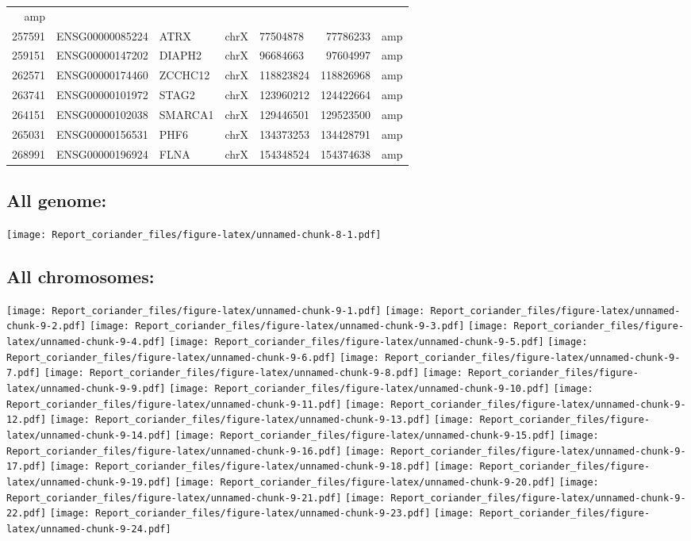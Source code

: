 \documentclass[]{article}
\begin{document}
\begin{longtable}[]{@{}rrlrlrl@{}}
amp\tabularnewline
257591 & ENSG00000085224 & ATRX & chrX & 77504878 & 77786233 &
amp\tabularnewline
259151 & ENSG00000147202 & DIAPH2 & chrX & 96684663 & 97604997 &
amp\tabularnewline
262571 & ENSG00000174460 & ZCCHC12 & chrX & 118823824 & 118826968 &
amp\tabularnewline
263741 & ENSG00000101972 & STAG2 & chrX & 123960212 & 124422664 &
amp\tabularnewline
264151 & ENSG00000102038 & SMARCA1 & chrX & 129446501 & 129523500 &
amp\tabularnewline
265031 & ENSG00000156531 & PHF6 & chrX & 134373253 & 134428791 &
amp\tabularnewline
268991 & ENSG00000196924 & FLNA & chrX & 154348524 & 154374638 &
amp\tabularnewline
\bottomrule
\end{longtable}

\hypertarget{all-genome}{%
\subsection{All genome:}\label{all-genome}}

\texttt{[image: Report\_coriander\_files/figure-latex/unnamed-chunk-8-1.pdf]}

\hypertarget{all-chromosomes}{%
\subsection{All chromosomes:}\label{all-chromosomes}}

\texttt{[image: Report\_coriander\_files/figure-latex/unnamed-chunk-9-1.pdf]}
\texttt{[image: Report\_coriander\_files/figure-latex/unnamed-chunk-9-2.pdf]}
\texttt{[image: Report\_coriander\_files/figure-latex/unnamed-chunk-9-3.pdf]}
\texttt{[image: Report\_coriander\_files/figure-latex/unnamed-chunk-9-4.pdf]}
\texttt{[image: Report\_coriander\_files/figure-latex/unnamed-chunk-9-5.pdf]}
\texttt{[image: Report\_coriander\_files/figure-latex/unnamed-chunk-9-6.pdf]}
\texttt{[image: Report\_coriander\_files/figure-latex/unnamed-chunk-9-7.pdf]}
\texttt{[image: Report\_coriander\_files/figure-latex/unnamed-chunk-9-8.pdf]}
\texttt{[image: Report\_coriander\_files/figure-latex/unnamed-chunk-9-9.pdf]}
\texttt{[image: Report\_coriander\_files/figure-latex/unnamed-chunk-9-10.pdf]}
\texttt{[image: Report\_coriander\_files/figure-latex/unnamed-chunk-9-11.pdf]}
\texttt{[image: Report\_coriander\_files/figure-latex/unnamed-chunk-9-12.pdf]}
\texttt{[image: Report\_coriander\_files/figure-latex/unnamed-chunk-9-13.pdf]}
\texttt{[image: Report\_coriander\_files/figure-latex/unnamed-chunk-9-14.pdf]}
\texttt{[image: Report\_coriander\_files/figure-latex/unnamed-chunk-9-15.pdf]}
\texttt{[image: Report\_coriander\_files/figure-latex/unnamed-chunk-9-16.pdf]}
\texttt{[image: Report\_coriander\_files/figure-latex/unnamed-chunk-9-17.pdf]}
\texttt{[image: Report\_coriander\_files/figure-latex/unnamed-chunk-9-18.pdf]}
\texttt{[image: Report\_coriander\_files/figure-latex/unnamed-chunk-9-19.pdf]}
\texttt{[image: Report\_coriander\_files/figure-latex/unnamed-chunk-9-20.pdf]}
\texttt{[image: Report\_coriander\_files/figure-latex/unnamed-chunk-9-21.pdf]}
\texttt{[image: Report\_coriander\_files/figure-latex/unnamed-chunk-9-22.pdf]}
\texttt{[image: Report\_coriander\_files/figure-latex/unnamed-chunk-9-23.pdf]}
\texttt{[image: Report\_coriander\_files/figure-latex/unnamed-chunk-9-24.pdf]}
\end{document}
